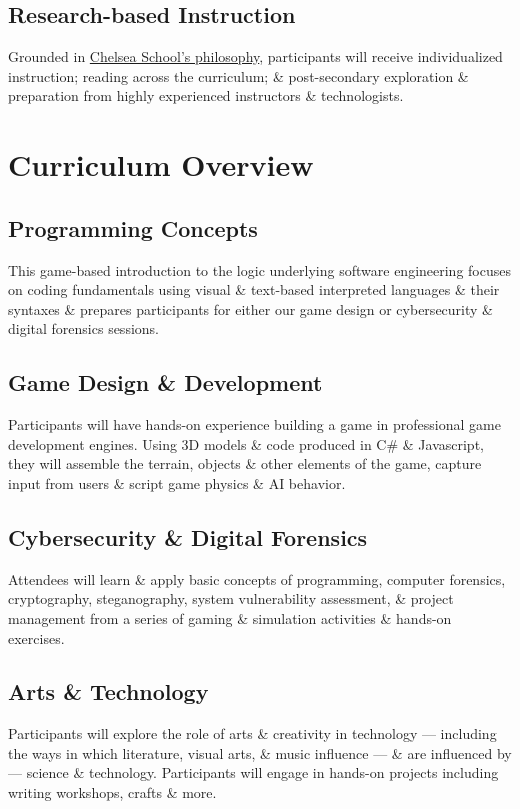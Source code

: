 \documentclass[letterpaper,10pt,english]{sphinxmanual}
\begin{document}
\subsection{Research-based Instruction}
\label{description:research-based-instruction}
Grounded in \href{http://chelseaschool.edu/about/}{Chelsea School's philosophy}, participants will receive individualized instruction; reading across the curriculum; \& post-secondary exploration \& preparation from highly experienced instructors \& technologists.


\section{Curriculum Overview}
\label{description:curriculum-overview}

\subsection{Programming Concepts}
\label{description:programming-concepts}
This game-based introduction to the logic underlying software engineering focuses on coding fundamentals using visual \& text-based interpreted languages \& their syntaxes \& prepares participants for either our game design or cybersecurity \& digital forensics sessions.


\subsection{Game Design \& Development}
\label{description:game-design-development}
Participants will have hands-on experience building a game in professional game development engines. Using 3D models \& code produced in C\# \& Javascript, they will assemble the terrain, objects \& other elements of the game, capture input from users \& script game physics \& AI behavior.


\subsection{Cybersecurity \& Digital Forensics}
\label{description:cybersecurity-digital-forensics}
Attendees will learn \& apply basic concepts of programming, computer forensics, cryptography, steganography, system vulnerability assessment, \& project management from a series of gaming \& simulation activities \& hands-on exercises.


\subsection{Arts \& Technology}
\label{description:arts-technology}
Participants will explore the role of arts \& creativity in technology — including the ways in which literature, visual arts, \& music influence — \& are influenced by — science \& technology. Participants will engage in hands-on projects including writing workshops, crafts \& more.
\end{document}
